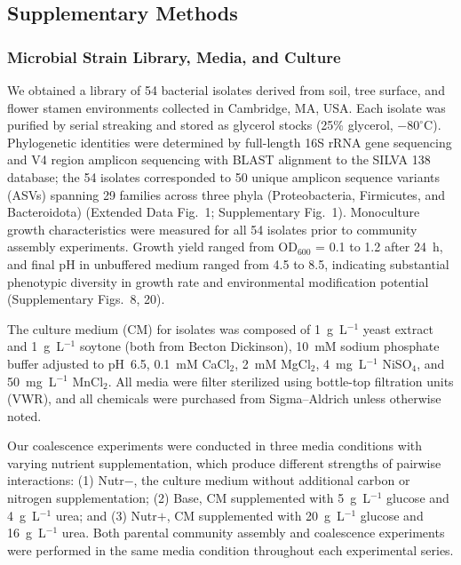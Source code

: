 \subsection*{Supplementary Methods}
\label{sec:suppl:methods}

\subsubsection*{Microbial Strain Library, Media, and Culture}
\label{sec:suppl:strains}

We obtained a library of 54 bacterial isolates derived from soil, tree surface, and flower stamen environments collected in Cambridge, MA, USA. Each isolate was purified by serial streaking and stored as glycerol stocks (25\% glycerol, $-80^\circ$C). Phylogenetic identities were determined by full-length 16S rRNA gene sequencing and V4 region amplicon sequencing with BLAST alignment to the SILVA 138 database; the 54 isolates corresponded to 50 unique amplicon sequence variants (ASVs) spanning 29 families across three phyla (Proteobacteria, Firmicutes, and Bacteroidota) (Extended Data Fig.~1; Supplementary Fig.~1). Monoculture growth characteristics were measured for all 54 isolates prior to community assembly experiments. Growth yield ranged from OD$_{600}$ = 0.1 to 1.2 after 24~h, and final pH in unbuffered medium ranged from 4.5 to 8.5, indicating substantial phenotypic diversity in growth rate and environmental modification potential (Supplementary Figs.~8, 20).

The culture medium (CM) for isolates was composed of 1~g~L$^{-1}$ yeast extract and 1~g~L$^{-1}$ soytone (both from Becton Dickinson), 10~mM sodium phosphate buffer adjusted to pH~6.5, 0.1~mM CaCl$_2$, 2~mM MgCl$_2$, 4~mg~L$^{-1}$ NiSO$_4$, and 50~mg~L$^{-1}$ MnCl$_2$. All media were filter sterilized using bottle-top filtration units (VWR), and all chemicals were purchased from Sigma--Aldrich unless otherwise noted.

Our coalescence experiments were conducted in three media conditions with varying nutrient supplementation, which produce different strengths of pairwise interactions: (1) Nutr$-$, the culture medium without additional carbon or nitrogen supplementation; (2) Base, CM supplemented with 5~g~L$^{-1}$ glucose and 4~g~L$^{-1}$ urea; and (3) Nutr$+$, CM supplemented with 20~g~L$^{-1}$ glucose and 16~g~L$^{-1}$ urea. Both parental community assembly and coalescence experiments were performed in the same media condition throughout each experimental series.

